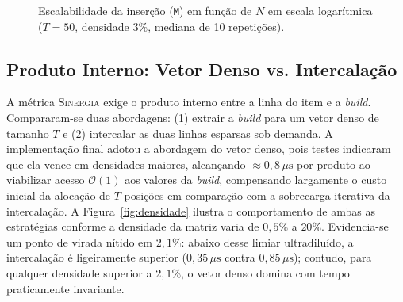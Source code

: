 \documentclass[letterpaper]{article}
\begin{document}
\begin{figure}[t]
\centering
{}
\caption{Escalabilidade da inserção (\texttt{M}) em função de $N$ em escala logarítmica ($T=50$, densidade $3\%$, mediana de 10 repetições).}
\label{fig:insercao}
\end{figure}

\subsection{Produto Interno: Vetor Denso vs. Intercalação}
A métrica \textsc{Sinergia} exige o produto interno entre a linha do item e a \textit{build}. Compararam-se duas abordagens: (1) extrair a \textit{build} para um vetor denso de tamanho $T$ e (2) intercalar as duas linhas esparsas sob demanda. A implementação final adotou a abordagem do vetor denso, pois testes indicaram que ela vence em densidades maiores, alcançando $\approx 0{,}8\,\mu\text{s}$ por produto ao viabilizar acesso $\mathcal{O}(1)$ aos valores da \textit{build}, compensando largamente o custo inicial da alocação de $T$ posições em comparação com a sobrecarga iterativa da intercalação. A Figura~\ref{fig:densidade} ilustra o comportamento de ambas as estratégias conforme a densidade da matriz varia de $0{,}5\%$ a $20\%$. Evidencia-se um ponto de virada nítido em $2{,}1\%$: abaixo desse limiar ultradiluído, a intercalação é ligeiramente superior ($0{,}35\,\mu\text{s}$ contra $0{,}85\,\mu\text{s}$); contudo, para qualquer densidade superior a $2{,}1\%$, o vetor denso domina com tempo praticamente invariante.
\end{document}
